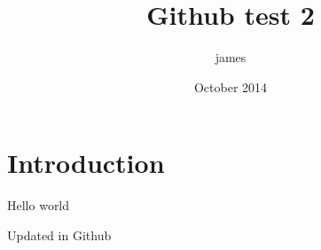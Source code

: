 \documentclass{article}
\title{Github test 2}
\author{james }
\date{October 2014}
\begin{document}
\maketitle

\section{Introduction}

Hello world

Updated in Github
\end{document}
